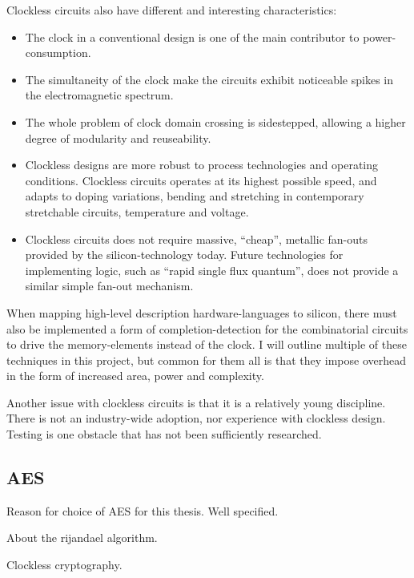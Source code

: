 Clockless circuits also have different and interesting characteristics:
\begin{itemize}
\item The clock in a conventional design is one of the main contributor to
power-consumption. 

\item The simultaneity of the clock make the circuits exhibit noticeable
spikes in the electromagnetic spectrum.

\item The whole problem of clock domain crossing is sidestepped, allowing a
higher degree of modularity and reuseability.

\item Clockless designs are more robust to process technologies and
operating conditions. Clockless circuits operates at its highest
possible speed, and adapts to doping variations, bending and stretching in
contemporary stretchable circuits, temperature and voltage.

\item Clockless circuits does not require massive, ``cheap'', metallic
fan-outs provided by the silicon-technology today. Future technologies
for implementing logic, such as ``rapid single flux quantum'', does not
provide a similar simple fan-out mechanism. 
\end{itemize}

When mapping high-level description hardware-languages to silicon,
there must also be implemented a form of completion-detection for the
combinatorial circuits to drive the memory-elements instead of the
clock. I will outline multiple of these techniques in this project,
but common for them all is that they impose overhead in the form of
increased area, power and complexity.

Another issue with clockless circuits is that it is a relatively young
discipline. There is not an industry-wide adoption, nor experience
with clockless design. Testing is one obstacle that has not been
sufficiently researched. 

\subsection{AES}

Reason for choice of AES for this thesis. Well specified.

About the rijandael algorithm.

Clockless cryptography.
